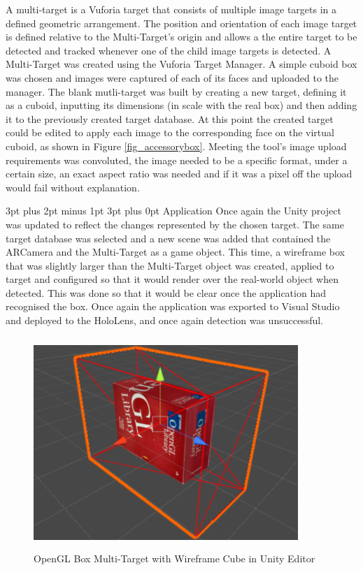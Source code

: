 \documentclass[12pt,a4paper,oneside]{article}
\makeatletter
\renewcommand\paragraph{\@startsection {paragraph}{1}{0mm} %
	                           {3pt plus 2pt minus 1pt} %
	                           {3pt plus 0pt} %
	                           {\normalfont}}
\makeatother
\begin{document}
A multi-target is a Vuforia target that consists of multiple image targets in a defined geometric arrangement. The position and orientation of each image target is defined relative to the Multi-Target's origin and allows a the entire target to be detected and tracked whenever one of the child image targets is detected. A Multi-Target was created using the Vuforia Target Manager. A simple cuboid box was chosen and images were captured of each of its faces and uploaded to the manager. The blank mutli-target was built by creating a new target, defining it as a cuboid, inputting its dimensions (in scale with the real box) and then adding it to the previously created target database. At this point the created target could be edited to apply each image to the corresponding face on the virtual cuboid, as shown in Figure \ref{fig_accessorybox}. Meeting the tool's image upload requirements was convoluted, the image needed to be a specific format, under a certain size, an exact aspect ratio was needed and if it was a pixel off the upload would fail without explanation. 

\paragraph{Application}
Once again the Unity project was updated to reflect the changes represented by the chosen target. The same target database was selected and a new scene was added that contained the ARCamera and the Multi-Target as a game object. This time, a wireframe box that was slightly larger than the Multi-Target object was created, applied to target and configured so that it would render over the real-world object when detected. This was done so that it would be clear once the application had recognised the box. Once again the application was exported to Visual Studio and deployed to the HoloLens, and once again detection was unsuccessful.

\begin{figure}[!h]
	\centering
	\includegraphics[width=10cm,height=8cm,keepaspectratio]{images/openglbox}
	\caption[OpenGL Box Multi-Target in Unity]{OpenGL Box Multi-Target with Wireframe Cube in Unity Editor}
	\label{fig_openglbox}
\end{figure}
\end{document}
